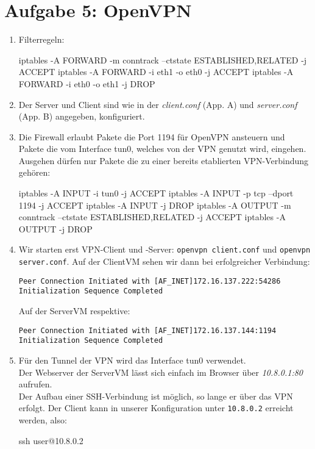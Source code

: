 \documentclass[a4paper,10pt]{scrartcl}
\begin{document}
	\section*{Aufgabe 5: OpenVPN}
	\label{sec:OpenVPN}
	\begin{enumerate}[\bfseries 1.]
		\item
            Filterregeln:
		    \begin{rootcommands}
iptables -A FORWARD -m conntrack --ctstate ESTABLISHED,RELATED -j ACCEPT
iptables -A FORWARD -i eth1 -o eth0 -j ACCEPT
iptables -A FORWARD -i eth0 -o eth1 -j DROP
		    \end{rootcommands}

		\item
		    Der Server und Client sind wie in der \textit{client.conf} (App. A)
		    und \textit{server.conf} (App. B) angegeben, konfiguriert.
		\item
            Die Firewall erlaubt Pakete die Port 1194 für OpenVPN
		    ansteuern und Pakete die vom Interface tun0, welches von der VPN
		    genutzt wird, eingehen.
		    Ausgehen dürfen nur Pakete die zu einer bereits etablierten
		    VPN-Verbindung gehören:
		    \begin{rootcommands}
iptables -A INPUT -i tun0 -j ACCEPT
iptables -A INPUT -p tcp --dport 1194 -j ACCEPT
iptables -A INPUT -j DROP
iptables -A OUTPUT -m conntrack --ctstate ESTABLISHED,RELATED -j ACCEPT
iptables -A OUTPUT -j DROP
            \end{rootcommands}
		\item
		      Wir starten erst VPN-Client und -Server:
		      \texttt{openvpn client.conf} und \texttt{openvpn server.conf}.
		      Auf der ClientVM sehen wir dann bei erfolgreicher Verbindung:\\
              \begin{verbatim}
Peer Connection Initiated with [AF_INET]172.16.137.222:54286
Initialization Sequence Completed
              \end{verbatim}
		      Auf der ServerVM respektive:\\
              \begin{verbatim}
Peer Connection Initiated with [AF_INET]172.16.137.144:1194
Initialization Sequence Completed
              \end{verbatim}
		\item
		      Für den Tunnel der VPN wird das Interface tun0 verwendet.\\
		      Der Webserver der ServerVM lässt sich einfach im Browser über
		      \textit{10.8.0.1:80} aufrufen.\\
		      Der Aufbau einer SSH-Verbindung ist möglich, so lange er über das
              VPN erfolgt. Der Client kann in unserer Konfiguration unter
              \texttt{10.8.0.2} erreicht werden, also:
              \begin{usercommands}
ssh user@10.8.0.2
              \end{usercommands}
	\end{enumerate}
\end{document}
